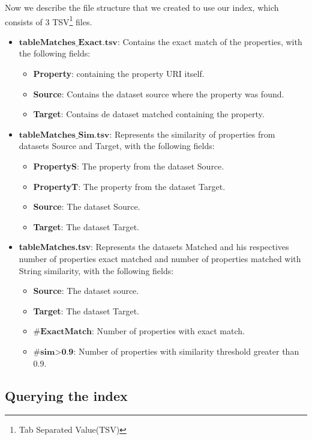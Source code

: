 \documentclass[sw]{iosart2x}
\begin{document}
Now we describe the file structure that we created to use our index, which consists of 3 TSV\footnote{Tab Separated Value(TSV)} files.
\begin{itemize}
    \item $\textbf{tableMatches\_Exact.tsv}$: Contains the exact match of the properties, with the following fields: 
    \begin{itemize}
        \item \textbf{Property}: containing the property URI itself.
        \item \textbf{Source}: Contains the dataset source where the property was found.
        \item \textbf{Target}: Contains de dataset matched containing the property.
    \end{itemize}
    \item $\textbf{tableMatches\_Sim.tsv}$: Represents the similarity of properties from datasets Source and Target, with the following fields:
    \begin{itemize}
        \item \textbf{PropertyS}: The property from the dataset Source.
        \item \textbf{PropertyT}: The property from the dataset Target.
        \item \textbf{Source}: The dataset Source.
        \item \textbf{Target}: The dataset Target.
    \end{itemize}
    \item \textbf{tableMatches.tsv}: Represents the datasets Matched and his respectives number of properties exact matched and number of properties matched with String similarity, with the following fields:
    \begin{itemize}
        \item \textbf{Source}: The dataset source.
        \item \textbf{Target}: The dataset Target.
        \item $\textbf{\#ExactMatch}$: Number of properties with exact match.
        \item $\textbf{\#sim>0.9}$: Number of properties with similarity threshold greater than 0.9.
    \end{itemize}
\end{itemize}

\subsection{Querying the index}
\end{document}

